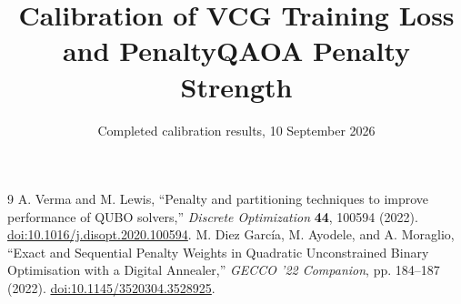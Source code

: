 \documentclass[10pt]{article}
\title{Calibration of VCG Training Loss and PenaltyQAOA Penalty Strength}
\author{}
\date{Completed calibration results, 10 September 2026}
\begin{document}
\maketitle

\FloatBarrier
\appendix

\begin{thebibliography}{9}
 A. Verma and M. Lewis, ``Penalty and partitioning techniques to improve performance of QUBO solvers,'' \emph{Discrete Optimization} \textbf{44}, 100594 (2022). \href{https://doi.org/10.1016/j.disopt.2020.100594}{doi:10.1016/j.disopt.2020.100594}.
 M. Diez Garc\'ia, M. Ayodele, and A. Moraglio, ``Exact and Sequential Penalty Weights in Quadratic Unconstrained Binary Optimisation with a Digital Annealer,'' \emph{GECCO '22 Companion}, pp. 184--187 (2022). \href{https://doi.org/10.1145/3520304.3528925}{doi:10.1145/3520304.3528925}.
\end{thebibliography}
\end{document}
